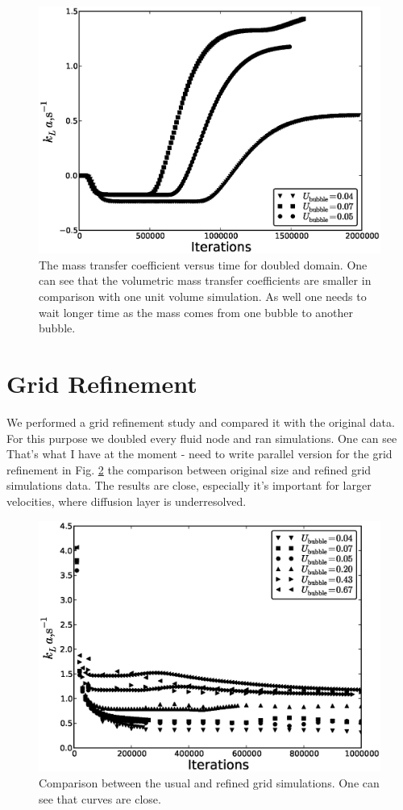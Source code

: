 \documentclass{article}
\begin{document}
\begin{figure}
\includegraphics[width=\textwidth]{Figures/steady_state_double_jos.eps}
\caption{The mass transfer coefficient versus time for doubled domain. One can see that the
volumetric mass transfer coefficients are smaller in comparison with one unit volume simulation. As
well one needs to wait longer time as the mass comes from one bubble to another bubble. 
\label{fig:steady:state:jos:double}}
\end{figure}

\section{Grid Refinement}
We performed a grid refinement study and compared it with the original data. For this purpose we
doubled every fluid node and ran simulations. One can see {\color{red} That's what I have at the
moment - need to write parallel version for the grid refinement} in Fig. \ref{fig:grid:comparison}
the comparison between original size and refined grid simulations data. The results are close,
especially it's important for larger velocities, where diffusion layer is underresolved.
\begin{figure}[htb!]
\includegraphics[width=\textwidth]{Figures/steady_state_comparison_grid.eps}
\caption{Comparison between the usual and refined grid simulations. One
can see that curves are close.\label{fig:grid:comparison}}
\end{figure}
\end{document}
